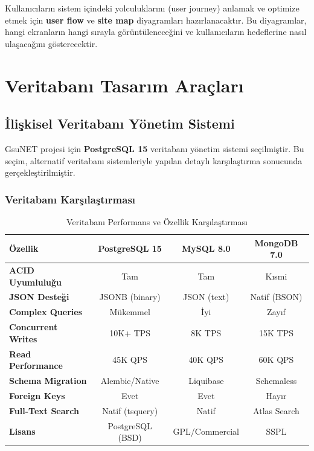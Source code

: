 \documentclass[a4paper,12pt]{report}
\begin{document}
Kullanıcıların sistem içindeki yolculuklarını (user journey) anlamak ve optimize etmek için \textbf{user flow} ve \textbf{site map} diyagramları hazırlanacaktır. Bu diyagramlar, hangi ekranların hangi sırayla görüntüleneceğini ve kullanıcıların hedeflerine nasıl ulaşacağını gösterecektir.

\section{Veritabanı Tasarım Araçları}

\subsection{İlişkisel Veritabanı Yönetim Sistemi}

GsuNET projesi için \textbf{PostgreSQL 15} veritabanı yönetim sistemi seçilmiştir. Bu seçim, alternatif veritabanı sistemleriyle yapılan detaylı karşılaştırma sonucunda gerçekleştirilmiştir.

\subsubsection{Veritabanı Karşılaştırması}

\begin{table}[h]
\centering
\small
\begin{tabular}{|l|c|c|c|}
\hline
\textbf{Özellik} & \textbf{PostgreSQL 15} & \textbf{MySQL 8.0} & \textbf{MongoDB 7.0} \\ \hline
\textbf{ACID Uyumluluğu} & Tam & Tam & Kısmi \\ \hline
\textbf{JSON Desteği} & JSONB (binary)} & JSON (text) & Natif (BSON) \\ \hline
\textbf{Complex Queries} & Mükemmel & İyi & Zayıf \\ \hline
\textbf{Concurrent Writes} & 10K+ TPS & 8K TPS & 15K TPS \\ \hline
\textbf{Read Performance} & 45K QPS & 40K QPS & 60K QPS \\ \hline
\textbf{Schema Migration} & Alembic/Native & Liquibase & Schemaless \\ \hline
\textbf{Foreign Keys} & Evet & Evet & Hayır \\ \hline
\textbf{Full-Text Search} & Natif (tsquery) & Natif & Atlas Search \\ \hline
\textbf{Lisans} & PostgreSQL (BSD) & GPL/Commercial & SSPL \\ \hline
\end{tabular}
\caption{Veritabanı Performans ve Özellik Karşılaştırması}
\end{table}
\end{document}
